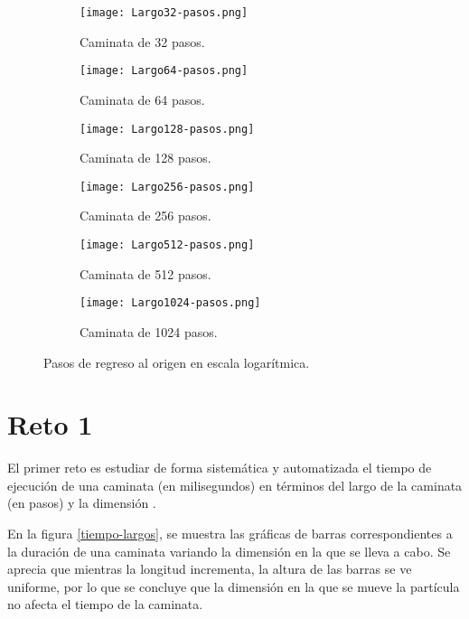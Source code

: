 \documentclass[12pt,letterpaper]{article}
\begin{document}
 
 \begin{figure}
 	\centering
 	\begin{subfigure}[b]{0.45\linewidth}
 		\texttt{[image: Largo32-pasos.png]}
 		 \caption{Caminata de 32 pasos.}
 		\label{32pasos}
 	\end{subfigure}
 	\begin{subfigure}[b]{0.45\linewidth}
 		\texttt{[image: Largo64-pasos.png]}
 		 \caption{Caminata de 64 pasos.}
 		\label{64pasos}
 	\end{subfigure}
 	\begin{subfigure}[b]{0.45\linewidth}
 		\texttt{[image: Largo128-pasos.png]}
 		\caption{Caminata de 128 pasos.}
 		\label{128pasos}
 	\end{subfigure}
	\begin{subfigure}[b]{0.45\linewidth}
 		\texttt{[image: Largo256-pasos.png]}
 		 \caption{Caminata de 256 pasos.}
 		\label{256pasos}
 	\end{subfigure}
 		\begin{subfigure}[b]{0.45\linewidth}
 		\texttt{[image: Largo512-pasos.png]}
 		 \caption{Caminata de 512 pasos.}
 		\label{512pasos}
 	\end{subfigure}
 		\begin{subfigure}[b]{0.45\linewidth}
 		\texttt{[image: Largo1024-pasos.png]}
 		\caption{Caminata de 1024 pasos.}
 		\label{1024pasos}
 		\end{subfigure}
 	\caption{Pasos de regreso al origen en escala logarítmica.}  		
\label{pasos-log}
 \end{figure}
 
 
 
 \section{Reto 1}
 El primer reto es estudiar de forma sistemática y automatizada el tiempo de ejecución de una caminata (en milisegundos) en términos del largo de la caminata (en pasos) y la dimensión \cite{elisa}. 
 
 En la figura \ref{tiempo-largos}, se muestra las gráficas de barras correspondientes a la duración de una caminata variando la dimensión en la que se lleva a cabo. Se aprecia que mientras la longitud incrementa, la altura de las barras se ve uniforme, por lo que se concluye que la dimensión en la que se mueve la partícula no afecta el tiempo de la caminata.
 
\end{document}
